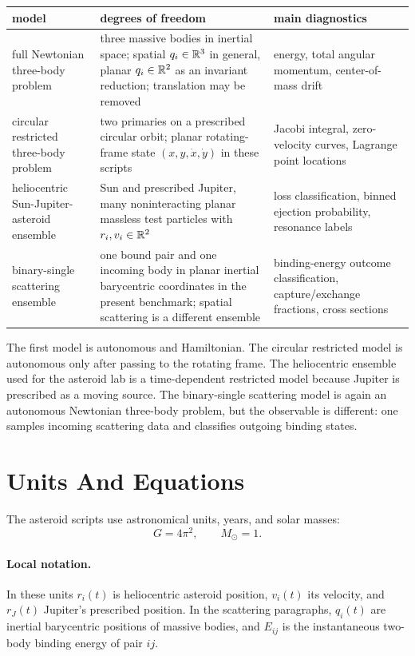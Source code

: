 \begin{center}
\begin{tabular}{p{} p{} p{}}
\hline
model & degrees of freedom & main diagnostics\\
\hline
full Newtonian three-body problem &
three massive bodies in inertial space; spatial \(q_i\in\mathbb{R}^3\) in general,
planar \(q_i\in\mathbb{R}^2\) as an invariant reduction; translation may be removed &
energy, total angular momentum, center-of-mass drift\\
circular restricted three-body problem &
two primaries on a prescribed circular orbit; planar rotating-frame state
\((x,y,\dot x,\dot y)\) in these scripts &
Jacobi integral, zero-velocity curves, Lagrange point locations\\
heliocentric Sun-Jupiter-asteroid ensemble &
Sun and prescribed Jupiter, many noninteracting planar massless test particles
with \(r_i,v_i\in\mathbb{R}^2\) &
loss classification, binned ejection probability, resonance labels\\
binary-single scattering ensemble &
one bound pair and one incoming body in planar inertial barycentric
coordinates in the present benchmark; spatial scattering is a different
ensemble &
binding-energy outcome classification, capture/exchange fractions, cross
sections\\
\hline
\end{tabular}
\end{center}

The first model is autonomous and Hamiltonian.  The circular restricted model
is autonomous only after passing to the rotating frame.  The heliocentric
ensemble used for the asteroid lab is a time-dependent restricted model
because Jupiter is prescribed as a moving source.
The binary-single scattering model is again an autonomous Newtonian three-body
problem, but the observable is different: one samples incoming scattering data
and classifies outgoing binding states.

\section{Units And Equations}
\label{sec:three-body-numerical-units}

The asteroid scripts use astronomical units, years, and solar masses:
\[
        G=4\pi^2,\qquad M_\odot=1 .
\]

\paragraph{Local notation.}
In these units \(r_i(t)\) is heliocentric asteroid position, \(v_i(t)\) its
velocity, and \(r_J(t)\) Jupiter's prescribed position.  In the scattering
paragraphs, \(q_i(t)\) are inertial barycentric positions of massive bodies,
and \(E_{ij}\) is the instantaneous two-body binding energy of pair \(ij\).

